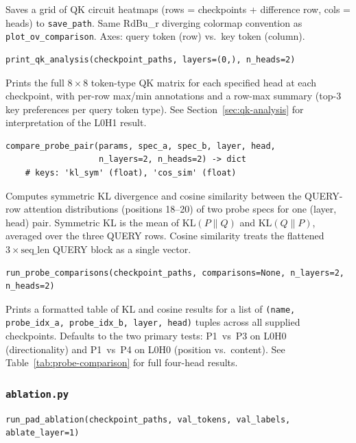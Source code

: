 \documentclass[11pt, a4paper]{article}
\begin{document}
Saves a grid of QK circuit heatmaps (rows = checkpoints + difference row,
cols = heads) to \texttt{save\_path}.  Same RdBu\_r diverging colormap
convention as \texttt{plot\_ov\_comparison}.  Axes: query token (row) vs.\
key token (column).

\begin{lstlisting}
print_qk_analysis(checkpoint_paths, layers=(0,), n_heads=2)
\end{lstlisting}

Prints the full $8 \times 8$ token-type QK matrix for each specified head at
each checkpoint, with per-row max/min annotations and a row-max summary
(top-3 key preferences per query token type).  See
Section~\ref{sec:qk-analysis} for interpretation of the L0H1 result.

\begin{lstlisting}
compare_probe_pair(params, spec_a, spec_b, layer, head,
                   n_layers=2, n_heads=2) -> dict
    # keys: 'kl_sym' (float), 'cos_sim' (float)
\end{lstlisting}

Computes symmetric KL divergence and cosine similarity between the QUERY-row
attention distributions (positions 18--20) of two probe specs for one
(layer, head) pair.  Symmetric KL is the mean of KL$(P\|Q)$ and KL$(Q\|P)$,
averaged over the three QUERY rows.  Cosine similarity treats the flattened
$3 \times \text{seq\_len}$ QUERY block as a single vector.

\begin{lstlisting}
run_probe_comparisons(checkpoint_paths, comparisons=None, n_layers=2, n_heads=2)
\end{lstlisting}

Prints a formatted table of KL and cosine results for a list of
\texttt{(name, probe\_idx\_a, probe\_idx\_b, layer, head)} tuples across all
supplied checkpoints.  Defaults to the two primary tests: P1~vs~P3 on L0H0
(directionality) and P1~vs~P4 on L0H0 (position vs.\ content).  See
Table~\ref{tab:probe-comparison} for full four-head results.

\subsubsection{\texttt{ablation.py}}

\begin{lstlisting}
run_pad_ablation(checkpoint_paths, val_tokens, val_labels, ablate_layer=1)
\end{lstlisting}
\end{document}
